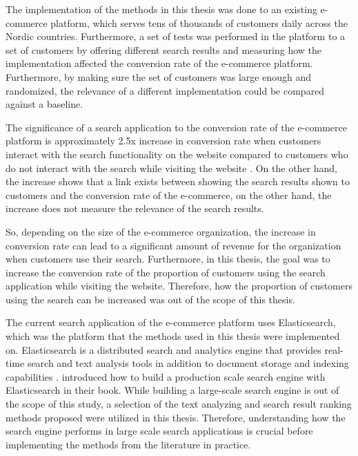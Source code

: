 The implementation of the methods in this thesis was done to an existing e-commerce platform, 
which serves tens of thousands of customers daily across the Nordic countries. 
Furthermore, a set of tests was performed in the platform to a set of customers by offering different search results 
and measuring how the implementation affected the conversion rate of the e-commerce platform.
Furthermore, by making sure the set of customers was large enough and randomized, 
the relevance of a different implementation could be compared against a baseline.


The significance of a search application to the conversion rate of the e-commerce platform is 
approximately 2.5x increase in conversion rate
when customers interact with the search functionality on the website compared to
customers who do not interact with the search while visiting the website \cite{powerAnalytics}.
On the other hand, the increase shows that a link exists between showing the search results 
shown to customers and the conversion rate of the e-commerce, 
on the other hand, the increase does not measure the relevance of the search results.

So, depending on the size of the e-commerce organization, the increase in conversion rate can lead to 
a significant amount of revenue for the organization when customers use their search.
Furthermore, in this thesis, the goal was to increase the conversion rate of the proportion of customers 
using the search application while visiting the website. 
Therefore, how the proportion of customers using the search can be increased was out of the scope of this thesis.


The current search application of the e-commerce platform uses Elasticsearch, which was
the platform that the methods used in this thesis were implemented on.
Elasticsearch is a distributed search and analytics engine that provides 
real-time search and text analysis tools in addition to document storage and indexing capabilities \cite{elasticIntro}. 
\citeauthor{relevantSearch} \cite{relevantSearch} introduced how to build 
a production scale search engine with Elasticsearch in their book. 
While building a large-scale search engine is out of the scope of this study, 
a selection of the text analyzing and search result ranking methods \citeauthor{relevantSearch} \cite{relevantSearch} 
proposed were utilized in this thesis.
Therefore, understanding how the search engine performs in large scale search applications 
is crucial before implementing the methods from the literature in practice.


